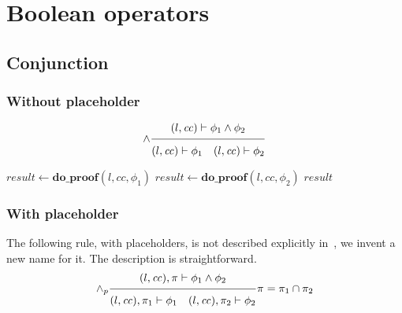 \documentclass{article}
\newcommand{\proofrule}[3][]{#1 \frac{\raisebox{.7ex}{\normalsize{$#2$}}}
  {\raisebox{-1.0ex}{\normalsize{$#3$}}}}
\newcommand{\placeholder}[1][]{\pi_{#1}}
\newcommand{\loc}{l}
\newcommand{\region}{\mathit{cc}}
\newcommand{\var}[1]{\ensuremath{\mathit{#1}}}
\newcommand{\method}[1]{\ensuremath{\mathbf{#1}}}
\begin{document}
\section{Boolean operators}

\subsection{Conjunction}

\subsubsection{Without placeholder}
\[
\proofrule[\land]
{(\loc, \region) \vdash \phi_1 \land \phi_2}
{(\loc, \region) \vdash \phi_1
\quad (\loc, \region) \vdash \phi_2}
\]

\begin{algorithm}[H]
\caption{$\method{do\_proof\_and}(\loc, \region, \phi_1 \land \phi_2)$}
\begin{algorithmic}
\STATE $\var{result} \gets \method{do\_proof}(\loc, \region, \phi_1)$
\IF{$\var{result}$}
  \STATE $\var{result} \gets \method{do\_proof}(\loc, \region, \phi_2)$
\ENDIF
\RETURN \var{result}
\end{algorithmic}
\end{algorithm}

\subsubsection{With placeholder}
The following rule, with placeholders, is not described explicitly in~\cite{FC:14,FC:14report}, we invent a new name for it. The description is straightforward.
\[
\proofrule[\land_p]
{(\loc, \region), \placeholder \vdash \phi_1 \land \phi_2}
{(\loc, \region), \placeholder[1] \vdash \phi_1
\quad (\loc, \region), \placeholder[2] \vdash \phi_2}
\placeholder = \placeholder[1] \cap \placeholder[2]
\]
\end{document}
